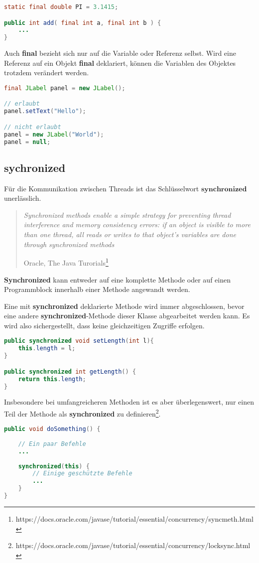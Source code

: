 \begin{lstlisting}[language=JAVA]
static final double PI = 3.1415;

public int add( final int a, final int b ) {
	...
}
\end{lstlisting}

Auch \textbf{final} bezieht sich nur auf die Variable oder Referenz selbst. Wird eine Referenz auf ein Objekt \textbf{final} deklariert, können die Variablen des Objektes trotzdem verändert werden.

\begin{lstlisting}[language=JAVA]
final JLabel panel = new JLabel();

// erlaubt
panel.setText("Hello");

// nicht erlaubt
panel = new JLabel("World");
panel = null;
\end{lstlisting}

\subsection*{sychronized}
Für die Kommunikation zwischen Threads ist das Schlüsselwort $\textbf{synchronized}$ unerlässlich. 
\begin{quote}%
\emph{Synchronized methods enable a simple strategy for preventing thread interference and memory consistency errors: if an object is visible to more than one thread, all reads or writes to that object's variables are done through synchronized methods}
\begin{flushright}Oracle, The Java Turorials\footnote{https://docs.oracle.com/javase/tutorial/essential/concurrency/syncmeth.html}\end{flushright}
\end{quote}
\textbf{Synchronized} kann entweder auf eine komplette Methode oder auf einen Programmblock innerhalb einer Methode angewandt werden.

Eine mit \textbf{synchronized} deklarierte Methode wird immer abgeschlossen, bevor eine andere \textbf{synchronized}-Methode dieser Klasse abgearbeitet werden kann. Es wird also sichergestellt, dass keine gleichzeitigen Zugriffe erfolgen.
\begin{lstlisting}[language=JAVA]
public synchronized void setLength(int l){
	this.length = l;
}

public synchronized int getLength() {
	return this.length;
}
\end{lstlisting}

Insbesondere bei umfangreicheren Methoden ist es aber überlegenswert, nur einen Teil der Methode als \textbf{synchronized} zu definieren\footnote{https://docs.oracle.com/javase/tutorial/essential/concurrency/locksync.html}.
\begin{lstlisting}[language=JAVA]
public void doSomething() {
	
	// Ein paar Befehle
	...
	
	synchronized(this) {
		// Einige geschützte Befehle
		...
	}
}
\end{lstlisting}

